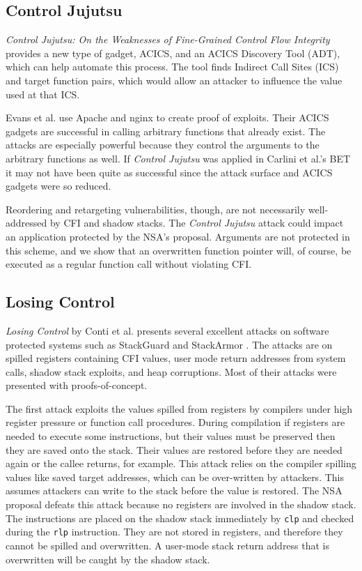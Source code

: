 \documentclass[conference,compsoc]{IEEEtran}
\begin{document}
\subsection{Control Jujutsu} \label{sec:ControlJujutsu}

\emph{Control Jujutsu: On the Weaknesses of Fine-Grained Control Flow Integrity} provides a new type of gadget, ACICS, and an ACICS Discovery Tool (ADT), which can help automate this process. The tool finds Indirect Call Sites (ICS) and target function pairs, which would allow an attacker to influence the value used at that ICS.

Evans et al. use Apache and nginx to create proof of exploits. Their ACICS gadgets are successful in calling arbitrary functions that already exist. The attacks are especially powerful because they control the arguments to the arbitrary functions as well. If \emph{Control Jujutsu} was applied in Carlini et al.'s BET it may not have been quite as successful since the attack surface and ACICS gadgets were so reduced.

Reordering and retargeting vulnerabilities, though, are not necessarily well-addressed by CFI and shadow stacks. The \emph{Control Jujutsu} attack could impact an application protected by the NSA's proposal. Arguments are not protected in this scheme, and we show that an overwritten function pointer will, of course, be executed as a regular function call without violating CFI.


\subsection{Losing Control} \label{sec:LosingControl}

\emph{Losing Control} by Conti et al. \cite{conti} presents several excellent attacks on software protected systems such as StackGuard \cite{Cowan} and StackArmor \cite{chen2015stackarmor}. The attacks are on spilled registers containing CFI values, user mode return addresses from system calls, shadow stack exploits, and heap corruptions. Most of their attacks were presented with proofs-of-concept.

The first attack exploits the values spilled from registers by compilers under high register pressure or function call procedures. During compilation if registers are needed to execute some instructions, but their values must be preserved then they are saved onto the stack. Their values are restored before they are needed again or the callee returns, for example. This attack relies on the compiler spilling values like saved target addresses, which can be over-written by attackers. This assumes attackers can write to the stack before the value is restored. The NSA proposal defeats this attack because no registers are involved in the shadow stack. The instructions are placed on the shadow stack immediately by \texttt{clp} and checked during the \texttt{rlp} instruction. They are not stored in registers, and therefore they cannot be spilled and overwritten. A user-mode stack return address that is overwritten will be caught by the shadow stack.
\end{document}
